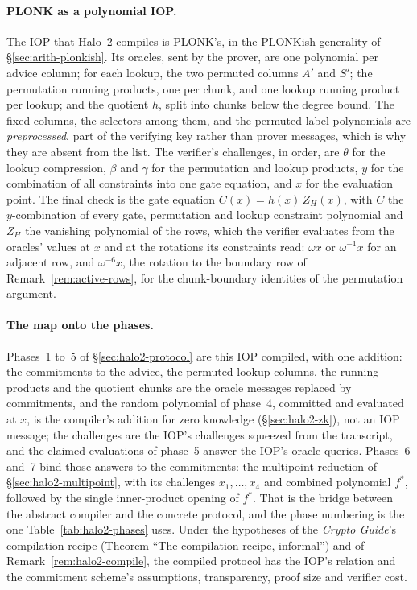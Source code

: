 \documentclass[11pt,a4paper]{article}
\theoremstyle{definition}
\newcommand{\ZH}{Z_H}
\begin{document}
\paragraph{PLONK as a polynomial IOP.}
The IOP that Halo~2 compiles is PLONK's, in the PLONKish generality of
\S\ref{sec:arith-plonkish}. Its oracles, sent by the prover, are one
polynomial per advice column; for each lookup, the two permuted columns
$A'$ and $S'$; the permutation running products, one per chunk, and one
lookup running product per lookup; and the quotient $h$, split into
chunks below the degree bound. The fixed columns, the selectors among
them, and the permuted-label polynomials are \emph{preprocessed},
part of the verifying key rather than prover messages, which is why they
are absent from the list. The verifier's challenges, in order, are
$\theta$ for the lookup compression, $\beta$ and $\gamma$ for the
permutation and lookup products, $y$ for the combination of all
constraints into one gate equation, and $x$ for the evaluation point. The
final check is the gate equation $C(x) = h(x)\,\ZH(x)$, with $C$ the
$y$-combination of every gate, permutation and lookup constraint
polynomial and $\ZH$ the vanishing polynomial of the rows, which the
verifier evaluates from the oracles' values at $x$ and at the rotations
its constraints read: $\omega x$ or $\omega^{-1}x$ for an adjacent row,
and $\omega^{-6}x$, the rotation to the boundary row of
Remark~\ref{rem:active-rows}, for the chunk-boundary identities of the
permutation argument.

\paragraph{The map onto the phases.}
Phases~1 to~5 of \S\ref{sec:halo2-protocol} are this IOP compiled, with one
addition: the commitments to the advice, the permuted lookup columns, the
running products and the quotient chunks are the oracle messages replaced by
commitments, and the random polynomial of phase~4, committed and evaluated at
$x$, is the compiler's addition for zero knowledge (\S\ref{sec:halo2-zk}), not
an IOP message; the challenges are the IOP's challenges squeezed from the
transcript, and the claimed evaluations of phase~5 answer the IOP's oracle
queries. Phases~6 and~7 bind those answers to the commitments: the multipoint
reduction of \S\ref{sec:halo2-multipoint}, with its challenges $x_1, \dots, x_4$
and combined polynomial $f^{*}$, followed by the single inner-product opening of
$f^{*}$. That is the bridge between the abstract compiler and the concrete
protocol, and the phase numbering is the one Table~\ref{tab:halo2-phases} uses.
Under the hypotheses of the \emph{Crypto Guide}'s compilation recipe (Theorem
``The compilation recipe, informal'') and of Remark~\ref{rem:halo2-compile}, the
compiled protocol has the IOP's relation and the commitment scheme's
assumptions, transparency, proof size and verifier cost.
\end{document}

